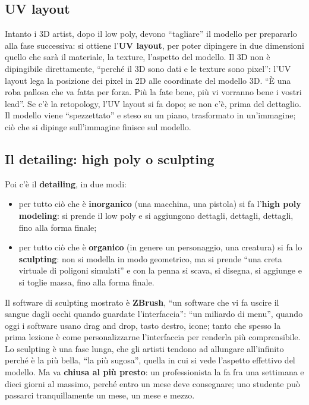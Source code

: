 \subsection{UV layout}

Intanto i 3D artist, dopo il low poly, devono ``tagliare'' il modello per
prepararlo alla fase successiva: si ottiene l'\textbf{UV layout}, per poter
dipingere in due dimensioni quello che sarà il materiale, la texture, l'aspetto
del modello. Il 3D non è dipingibile direttamente, ``perché il 3D sono dati e le
texture sono pixel'': l'UV layout lega la posizione dei pixel in 2D alle
coordinate del modello 3D. ``È una roba pallosa che va fatta per forza. Più la
fate bene, più vi vorranno bene i vostri lead''. Se c'è la retopology, l'UV
layout si fa dopo; se non c'è, prima del dettaglio. Il modello viene
``spezzettato'' e steso su un piano, trasformato in un'immagine; ciò che si
dipinge sull'immagine finisce sul modello.

\subsection{Il detailing: high poly o sculpting}

Poi c'è il \textbf{detailing}, in due modi:
\begin{itemize}
  \item per tutto ciò che è \textbf{inorganico} (una macchina, una pistola) si
        fa l'\textbf{high poly modeling}: si prende il low poly e si aggiungono
        dettagli, dettagli, dettagli, fino alla forma finale;
  \item per tutto ciò che è \textbf{organico} (in genere un personaggio, una
        creatura) si fa lo \textbf{sculpting}: non si modella in modo
        geometrico, ma si prende ``una creta virtuale di poligoni simulati'' e
        con la penna si scava, si disegna, si aggiunge e si toglie massa, fino
        alla forma finale.
\end{itemize}
Il software di sculpting mostrato è \textbf{ZBrush}, ``un software che vi fa
uscire il sangue dagli occhi quando guardate l'interfaccia'': ``un miliardo di
menu'', quando oggi i software usano drag and drop, tasto destro, icone; tanto
che spesso la prima lezione è come personalizzarne l'interfaccia per renderla
più comprensibile. Lo sculpting è una fase lunga, che gli artisti tendono ad
allungare all'infinito perché è la più bella, ``la più sugosa'', quella in cui
si vede l'aspetto effettivo del modello. Ma va \textbf{chiusa al più presto}: un
professionista la fa fra una settimana e dieci giorni al massimo, perché entro
un mese deve consegnare; uno studente può passarci tranquillamente un mese, un
mese e mezzo.

